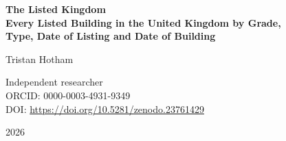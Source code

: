 \documentclass[11pt,a4paper]{article}
\begin{document}
\begin{center}
{\Large\bfseries The Listed Kingdom\\[2pt] Every Listed Building in the United Kingdom by Grade,\\[2pt] Type, Date of Listing and Date of Building\par}
\vspace{1.2em}
{\large Tristan Hotham\par}
\vspace{0.3em}
{\small Independent researcher\\
ORCID: 0000-0003-4931-9349\\
DOI: \href{https://doi.org/10.5281/zenodo.23761429}{https://doi.org/10.5281/zenodo.23761429}\par}
\vspace{0.8em}
2026
\end{center}
\end{document}
